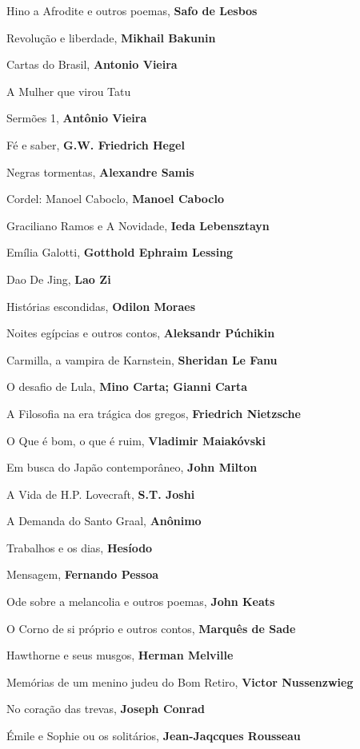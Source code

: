 \begin{multicols}{2}
\begin{enumerate}
{\item Hino a Afrodite e outros poemas, \textbf{Safo de Lesbos}
\item Revolução e liberdade, \textbf{Mikhail Bakunin}
\item Cartas do Brasil, \textbf{Antonio Vieira}
\item A Mulher que virou Tatu
\item Sermões 1, \textbf{Antônio Vieira}
\item Fé e saber, \textbf{G.W. Friedrich Hegel}
\item Negras tormentas, \textbf{Alexandre Samis}
\item Cordel: Manoel Caboclo, \textbf{Manoel Caboclo}
\item Graciliano Ramos e A Novidade, \textbf{Ieda Lebensztayn}
\item Emília Galotti, \textbf{Gotthold Ephraim Lessing}
\item Dao De Jing, \textbf{Lao Zi}
\item Histórias escondidas, \textbf{Odilon Moraes}
\item Noites egípcias e outros contos, \textbf{Aleksandr Púchikin}
\item Carmilla, a vampira de Karnstein, \textbf{Sheridan Le Fanu}
\item O desafio de Lula, \textbf{Mino Carta; Gianni Carta}
\item A Filosofia na era trágica dos gregos, \textbf{Friedrich Nietzsche}
\item O Que é bom, o que é ruim, \textbf{Vladimir Maiakóvski}
\item Em busca do Japão contemporâneo, \textbf{John Milton}
\item A Vida de H.P. Lovecraft, \textbf{S.T. Joshi}
\item A Demanda do Santo Graal, \textbf{Anônimo}
\item Trabalhos e os dias, \textbf{Hesíodo}
\item Mensagem, \textbf{Fernando Pessoa}
\item Ode sobre a melancolia e outros poemas, \textbf{John Keats}
\item O Corno de si próprio e outros contos, \textbf{Marquês de Sade}
\item Hawthorne e seus musgos, \textbf{Herman Melville}
\item Memórias de um menino judeu do Bom Retiro, \textbf{Victor Nussenzwieg}
\item No coração das trevas, \textbf{Joseph Conrad}
\item Émile e Sophie ou os solitários, \textbf{Jean-Jaqcques Rousseau}
}
\end{enumerate}
\end{multicols}
